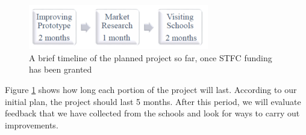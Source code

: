 \begin{center}
\begin{figure}[htb]
    \centering
    \includegraphics[width=0.7\textwidth]{education/STFCproposal/STFCProposal_Timeline2.png}
    \caption{A brief timeline of the planned project so far, once STFC funding has been granted}
    \label{fig:PropTimeline_STFC}
\end{figure} 
\end{center}

Figure \ref{fig:PropTimeline_STFC} shows how long each portion of the project will last. According to our initial plan, the project should last 5 months. After this period, we will evaluate feedback that we have collected from the schools and look for ways to carry out improvements.

